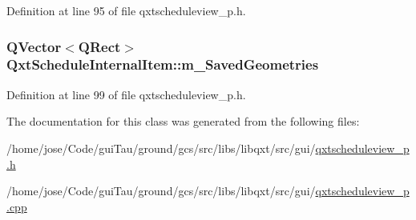 Definition at line 95 of file qxtscheduleview\-\_\-p.\-h.

\hypertarget{class_qxt_schedule_internal_item_adb0eab97c8cbc454ae13c106a13ca6b3}{
\subsubsection[{m\-\_\-\-Saved\-Geometries}]{\setlength{\rightskip}{0pt plus 5cm}Q\-Vector$<$Q\-Rect$>$ Qxt\-Schedule\-Internal\-Item\-::m\-\_\-\-Saved\-Geometries}}\label{class_qxt_schedule_internal_item_adb0eab97c8cbc454ae13c106a13ca6b3}


Definition at line 99 of file qxtscheduleview\-\_\-p.\-h.



The documentation for this class was generated from the following files\-:\begin{DoxyCompactItemize}
\item 
/home/jose/\-Code/gui\-Tau/ground/gcs/src/libs/libqxt/src/gui/\hyperlink{qxtscheduleview__p_8h}{qxtscheduleview\-\_\-p.\-h}\item 
/home/jose/\-Code/gui\-Tau/ground/gcs/src/libs/libqxt/src/gui/\hyperlink{qxtscheduleview__p_8cpp}{qxtscheduleview\-\_\-p.\-cpp}\end{DoxyCompactItemize}
